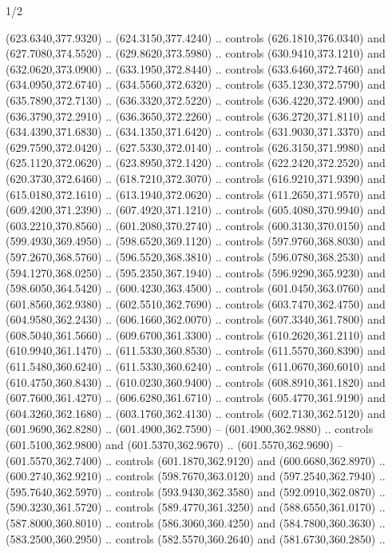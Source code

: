 \begin{flagdescription}{1/2}
\begin{scope}[xshift=0.5\flaglength,yshift=0.5\flagwidth,scale=\flagwidth/759]
\begin{scope}[y=0.8pt, x=0.8pt, yscale=-1,shift={(-720,-480)}]
\begin{scope}[cm={{1.14637,0.0,0.0,1.17117,(33.17849,82.1384)}}]
  (623.6340,377.9320) .. (624.3150,377.4240) .. controls (626.1810,376.0340) and
  (627.7080,374.5520) .. (629.8620,373.5980) .. controls (630.9410,373.1210) and
  (632.0620,373.0900) .. (633.1950,372.8440) .. controls (633.6460,372.7460) and
  (634.0950,372.6740) .. (634.5560,372.6320) .. controls (635.1230,372.5790) and
  (635.7890,372.7130) .. (636.3320,372.5220) .. controls (636.4220,372.4900) and
  (636.3790,372.2910) .. (636.3650,372.2260) .. controls (636.2720,371.8110) and
  (634.4390,371.6830) .. (634.1350,371.6420) .. controls (631.9030,371.3370) and
  (629.7590,372.0420) .. (627.5330,372.0140) .. controls (626.3150,371.9980) and
  (625.1120,372.0620) .. (623.8950,372.1420) .. controls (622.2420,372.2520) and
  (620.3730,372.6460) .. (618.7210,372.3070) .. controls (616.9210,371.9390) and
  (615.0180,372.1610) .. (613.1940,372.0620) .. controls (611.2650,371.9570) and
  (609.4200,371.2390) .. (607.4920,371.1210) .. controls (605.4080,370.9940) and
  (603.2210,370.8560) .. (601.2080,370.2740) .. controls (600.3130,370.0150) and
  (599.4930,369.4950) .. (598.6520,369.1120) .. controls (597.9760,368.8030) and
  (597.2670,368.5760) .. (596.5520,368.3810) .. controls (596.0780,368.2530) and
  (594.1270,368.0250) .. (595.2350,367.1940) .. controls (596.9290,365.9230) and
  (598.6050,364.5420) .. (600.4230,363.4500) .. controls (601.0450,363.0760) and
  (601.8560,362.9380) .. (602.5510,362.7690) .. controls (603.7470,362.4750) and
  (604.9580,362.2430) .. (606.1660,362.0070) .. controls (607.3340,361.7800) and
  (608.5040,361.5660) .. (609.6700,361.3300) .. controls (610.2620,361.2110) and
  (610.9940,361.1470) .. (611.5330,360.8530) .. controls (611.5570,360.8390) and
  (611.5480,360.6240) .. (611.5330,360.6240) .. controls (611.0670,360.6010) and
  (610.4750,360.8430) .. (610.0230,360.9400) .. controls (608.8910,361.1820) and
  (607.7600,361.4270) .. (606.6280,361.6710) .. controls (605.4770,361.9190) and
  (604.3260,362.1680) .. (603.1760,362.4130) .. controls (602.7130,362.5120) and
  (601.9690,362.8280) .. (601.4900,362.7590) -- (601.4900,362.9880) .. controls
  (601.5100,362.9800) and (601.5370,362.9670) .. (601.5570,362.9690) --
  (601.5570,362.7400) .. controls (601.1870,362.9120) and (600.6680,362.8970) ..
  (600.2740,362.9210) .. controls (598.7670,363.0120) and (597.2540,362.7940) ..
  (595.7640,362.5970) .. controls (593.9430,362.3580) and (592.0910,362.0870) ..
  (590.3230,361.5720) .. controls (589.4770,361.3250) and (588.6550,361.0170) ..
  (587.8000,360.8010) .. controls (586.3060,360.4250) and (584.7800,360.3630) ..
  (583.2500,360.2950) .. controls (582.5570,360.2640) and (581.6730,360.2850) ..

\end{scope}
\end{scope}
\end{scope}
\end{flagdescription}

